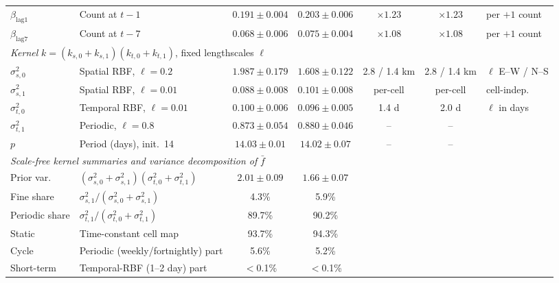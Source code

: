 \begin{table}[t]
\begin{tabular}{llcccc l}
$\beta_{\mathrm{lag}1}$ & Count at $t-1$ & $0.191 \pm 0.004$ & $0.203 \pm 0.006$ & $\times1.23$ & $\times1.23$ & per $+1$ count \\
$\beta_{\mathrm{lag}7}$ & Count at $t-7$ & $0.068 \pm 0.006$ & $0.075 \pm 0.004$ & $\times1.08$ & $\times1.08$ & per $+1$ count \\
\midrule
\multicolumn{7}{l}{\textit{Kernel} $k=(k_{s,0}+k_{s,1})(k_{t,0}+k_{t,1})$, fixed lengthscales $\ell$} \\
$\sigma^2_{s,0}$ & Spatial RBF, $\ell{=}0.2$ & $1.987 \pm 0.179$ & $1.608 \pm 0.122$ & 2.8 / 1.4 km & 2.8 / 1.4 km & $\ell$ E--W / N--S \\
$\sigma^2_{s,1}$ & Spatial RBF, $\ell{=}0.01$ & $0.088 \pm 0.008$ & $0.101 \pm 0.008$ & per-cell & per-cell & cell-indep. \\
$\sigma^2_{t,0}$ & Temporal RBF, $\ell{=}0.01$ & $0.100 \pm 0.006$ & $0.096 \pm 0.005$ & 1.4 d & 2.0 d & $\ell$ in days \\
$\sigma^2_{t,1}$ & Periodic, $\ell{=}0.8$ & $0.873 \pm 0.054$ & $0.880 \pm 0.046$ & -- & -- &  \\
$p$ & Period (days), init.\ 14 & $14.03 \pm 0.01$ & $14.02 \pm 0.07$ & -- & -- &  \\
\midrule
\multicolumn{7}{l}{\textit{Scale-free kernel summaries and variance decomposition of} $\bar f$} \\
Prior var. & $(\sigma^2_{s,0}{+}\sigma^2_{s,1})(\sigma^2_{t,0}{+}\sigma^2_{t,1})$ & $2.01 \pm 0.09$ & $1.66 \pm 0.07$ &  &  &  \\
Fine share & $\sigma^2_{s,1}/(\sigma^2_{s,0}{+}\sigma^2_{s,1})$ & 4.3\% & 5.9\% &  &  &  \\
Periodic share & $\sigma^2_{t,1}/(\sigma^2_{t,0}{+}\sigma^2_{t,1})$ & 89.7\% & 90.2\% &  &  &  \\
Static & Time-constant cell map & 93.7\% & 94.3\% &  &  &  \\
Cycle & Periodic (weekly/fortnightly) part & 5.6\% & 5.2\% &  &  &  \\
Short-term & Temporal-RBF (1--2 day) part & $<$0.1\% & $<$0.1\% &  &  &  \\
\bottomrule
\end{tabular}
\end{table}
